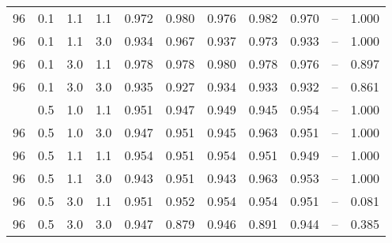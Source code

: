 \begin{longtable}[t]{ccccrrrrrrc}
96 & 0.1 & 1.1 & 1.1 & 0.972 & 0.980 & 0.976 & 0.982 & 0.970 & -- & 1.000\\
96 & 0.1 & 1.1 & 3.0 & 0.934 & 0.967 & 0.937 & 0.973 & 0.933 & -- & 1.000\\
96 & 0.1 & 3.0 & 1.1 & 0.978 & 0.978 & 0.980 & 0.978 & 0.976 & -- & 0.897\\
96 & 0.1 & 3.0 & 3.0 & 0.935 & 0.927 & 0.934 & 0.933 & 0.932 & -- & 0.861\\
\addlinespace
96 & 0.5 & 1.0 & 1.1 & 0.951 & 0.947 & 0.949 & 0.945 & 0.954 & -- & 1.000\\
96 & 0.5 & 1.0 & 3.0 & 0.947 & 0.951 & 0.945 & 0.963 & 0.951 & -- & 1.000\\
96 & 0.5 & 1.1 & 1.1 & 0.954 & 0.951 & 0.954 & 0.951 & 0.949 & -- & 1.000\\
96 & 0.5 & 1.1 & 3.0 & 0.943 & 0.951 & 0.943 & 0.963 & 0.953 & -- & 1.000\\
96 & 0.5 & 3.0 & 1.1 & 0.951 & 0.952 & 0.954 & 0.954 & 0.951 & -- & 0.081\\
96 & 0.5 & 3.0 & 3.0 & 0.947 & 0.879 & 0.946 & 0.891 & 0.944 & -- & 0.385\\
\bottomrule
\end{longtable}
\endgroup{}
